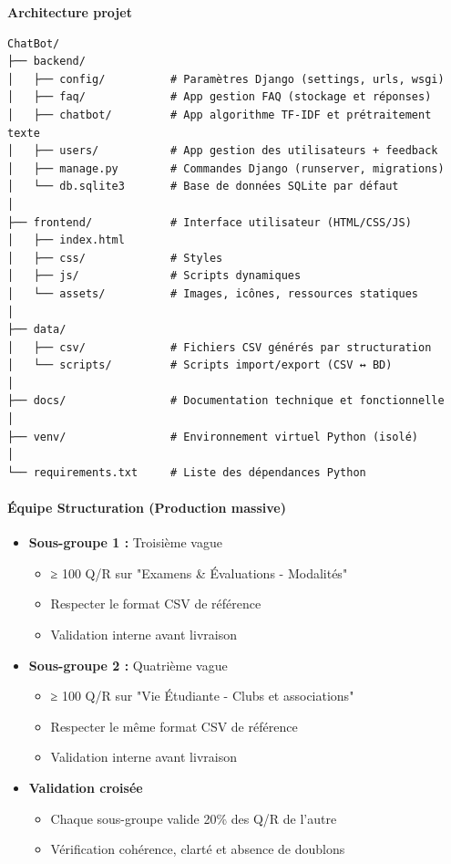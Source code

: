 \documentclass[11pt,a4paper]{article}
\begin{document}
\textbf{Architecture projet}
\begin{verbatim}
ChatBot/
├── backend/
│   ├── config/          # Paramètres Django (settings, urls, wsgi)
│   ├── faq/             # App gestion FAQ (stockage et réponses)
│   ├── chatbot/         # App algorithme TF-IDF et prétraitement texte
│   ├── users/           # App gestion des utilisateurs + feedback
│   ├── manage.py        # Commandes Django (runserver, migrations)
│   └── db.sqlite3       # Base de données SQLite par défaut
│
├── frontend/            # Interface utilisateur (HTML/CSS/JS)
│   ├── index.html
│   ├── css/             # Styles
│   ├── js/              # Scripts dynamiques
│   └── assets/          # Images, icônes, ressources statiques
│
├── data/
│   ├── csv/             # Fichiers CSV générés par structuration
│   └── scripts/         # Scripts import/export (CSV ↔ BD)
│
├── docs/                # Documentation technique et fonctionnelle
│
├── venv/                # Environnement virtuel Python (isolé)
│
└── requirements.txt     # Liste des dépendances Python

\end{verbatim}


\paragraph{Équipe Structuration (Production massive)}
\begin{itemize}
    \item[$\square$] \textbf{Sous-groupe 1 :} Troisième vague
    \begin{itemize}
        \item ≥ 100 Q/R sur "Examens \& Évaluations - Modalités"
        \item Respecter le format CSV de référence
        \item Validation interne avant livraison
    \end{itemize}

    \item[$\square$] \textbf{Sous-groupe 2 :} Quatrième vague
    \begin{itemize}
        \item ≥ 100 Q/R sur "Vie Étudiante - Clubs et associations"
        \item Respecter le même format CSV de référence
        \item Validation interne avant livraison
    \end{itemize}

    \item[$\square$] \textbf{Validation croisée}
    \begin{itemize}
        \item Chaque sous-groupe valide 20\% des Q/R de l'autre
        \item Vérification cohérence, clarté et absence de doublons
    \end{itemize}
\end{itemize}
\end{document}
